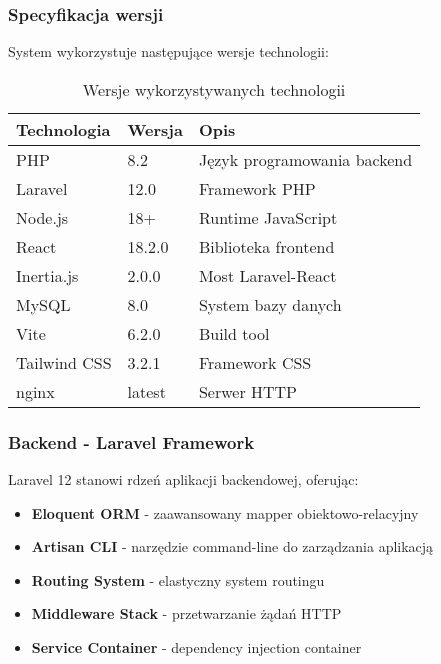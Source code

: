 \documentclass[12pt,a4paper]{article}
\begin{document}
    \subsubsection{Specyfikacja wersji}

    System wykorzystuje następujące wersje technologii:

    \begin{table}[h]
        \centering
        \begin{tabular}{|l|l|l|}
            \hline
            \textbf{Technologia} & \textbf{Wersja} & \textbf{Opis} \\
            \hline
            PHP & 8.2 & Język programowania backend \\
            Laravel & 12.0 & Framework PHP \\
            Node.js & 18+ & Runtime JavaScript \\
            React & 18.2.0 & Biblioteka frontend \\
            Inertia.js & 2.0.0 & Most Laravel-React \\
            MySQL & 8.0 & System bazy danych \\
            Vite & 6.2.0 & Build tool \\
            Tailwind CSS & 3.2.1 & Framework CSS \\
            nginx & latest & Serwer HTTP \\
            \hline
        \end{tabular}
        \caption{Wersje wykorzystywanych technologii}
    \end{table}

    \subsubsection{Backend - Laravel Framework}

    Laravel 12 stanowi rdzeń aplikacji backendowej, oferując:

    \begin{itemize}
        \item \textbf{Eloquent ORM} - zaawansowany mapper obiektowo-relacyjny
        \item \textbf{Artisan CLI} - narzędzie command-line do zarządzania aplikacją
        \item \textbf{Routing System} - elastyczny system routingu
        \item \textbf{Middleware Stack} - przetwarzanie żądań HTTP
        \item \textbf{Service Container} - dependency injection container
    \end{itemize}
\end{document}
